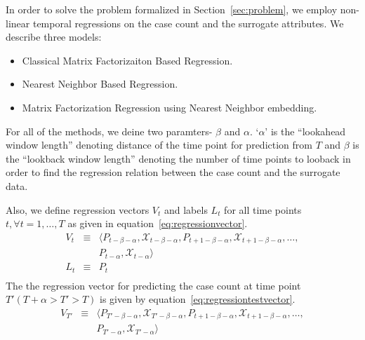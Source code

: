
In order to solve the problem formalized in Section~\ref{sec:problem}, we employ
non-linear temporal regressions on the case count and the surrogate attributes. 
We describe three models:
\begin{itemize}
  \item Classical Matrix Factorizaiton Based Regression.
  \item Nearest Neighbor Based Regression.
  \item Matrix Factorization Regression using Nearest Neighbor embedding.
\end{itemize}
For all of the methods, we deine two paramters- $\beta$ and $\alpha$. 
`$\alpha$' is the ``lookahead window length'' denoting distance of the time point for prediction from $T$ 
 and $\beta$ is the ``lookback window length'' denoting the number of time points to looback
in order to find the regression relation between the case count and the surrogate 
data.

Also, we define regression vectors $V_t$  and 
labels $L_t$ for all time points $t, \forall t = 1,\dots, T$
as given in equation~\ref{eq:regressionvector}.
\begin{equation}
  \label{eq:regressionvector}
  \begin{array}{lcl}
    V_t & \equiv & \langle P_{t-\beta - \alpha}, \mathcal{X}_{t-\beta - \alpha}, P_{t + 1 -\beta-\alpha}, \mathcal{X}_{t + 1 - \beta-\alpha}, \dots, \\
        &        & P_{t-\alpha},\mathcal{X}_{t-\alpha} \rangle \\
    L_t & \equiv & P_{t}\\
  \end{array}
\end{equation}
The the regression vector for predicting the case count at time point $T' (T +
\alpha > T' > T)$ is given by equation~\ref{eq:regressiontestvector}.
\begin{equation}
  \label{eq:regressiontestvector}
  \begin{array}{lcl}
    V_{T'} & \equiv & \langle P_{T'-\beta - \alpha}, \mathcal{X}_{T'-\beta - \alpha}, P_{t + 1 -\beta-\alpha}, \mathcal{X}_{t + 1 - \beta-\alpha}, \dots, \\
           &        & P_{T'-\alpha},\mathcal{X}_{T'-\alpha} \rangle \\
  \end{array}
\end{equation}


